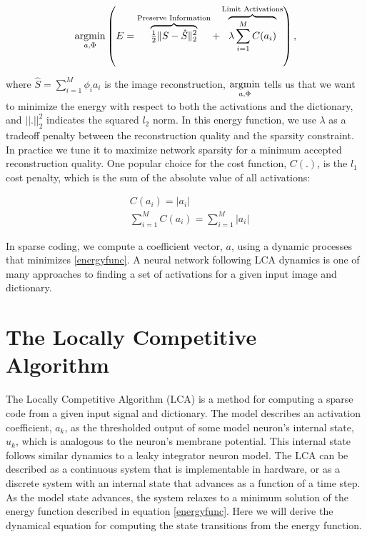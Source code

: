 \begin{equation}
    \argmin\limits_{a, \Phi}
        \left( E =
            \overbrace{ \tfrac{1}{2} \| S - \hat{S} \|_{2}^{2} }^\text{Preserve Information} +
        \overbrace{ \lambda \sum\limits_{i=1}^{M}C(a_{i}) }^\text{Limit Activations} \right),
\label{energyfunc}
\end{equation}

where $\hat{S} = \sum\limits_{i=1}^{M}\phi_{i}a_{i}$ is the image reconstruction, $\argmin\limits_{a, \Phi}$ tells us that we want to minimize the energy with respect to both the activations and the dictionary, and $||.||_2^2$ indicates the squared $l_2$ norm. In this energy function, we use $\lambda$ as a tradeoff penalty between the reconstruction quality and the sparsity constraint. In practice we tune it to maximize network sparsity for a minimum accepted reconstruction quality. One popular choice for the cost function, $C(.)$, is the $l_1$ cost penalty, which is the sum of the absolute value of all activations:

\begin{align}\label{l1cost}
  &C(a_{i}) = |a_{i}| \\
  &\sum\limits_{i=1}^{M}C(a_{i}) = \sum\limits_{i=1}^{M}|a_{i}|
\end{align}

In sparse coding, we compute a coefficient vector, $a$, using a dynamic processes that minimizes \eqref{energyfunc}. A neural network following LCA dynamics is one of many approaches to finding a set of activations for a given input image and dictionary.

\section{The Locally Competitive Algorithm}
The Locally Competitive Algorithm (LCA) is a method for computing a sparse code from a given input signal and dictionary. The model describes an activation coefficient, $a_{k}$, as the thresholded output of some model neuron's internal state, $u_{k}$, which is analogous to the neuron's membrane potential. This internal state follows similar dynamics to a leaky integrator neuron model. The LCA can be described as a continuous system that is implementable in hardware, or as a discrete system with an internal state that advances as a function of a time step. As the model state advances, the system relaxes to a minimum solution of the energy function described in equation \eqref{energyfunc}. Here we will derive the dynamical equation for computing the state transitions from the energy function.

